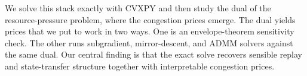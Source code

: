 We solve this stack exactly with CVXPY and then study the dual of the resource-pressure problem, where the congestion prices emerge. The dual yields prices that we put to work in two ways. One is an envelope-theorem sensitivity check. The other runs subgradient, mirror-descent, and ADMM solvers against the same dual. Our central finding is that the exact solve recovers sensible replay and state-transfer structure together with interpretable congestion prices.